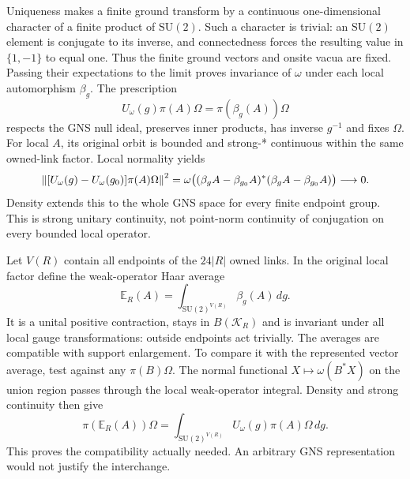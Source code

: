 Uniqueness makes a finite ground transform by a continuous one-dimensional character of a finite product of $\mathrm{SU}(2)$. Such a character is trivial: an $\mathrm{SU}(2)$ element is conjugate to its inverse, and connectedness forces the resulting value in $\{1,-1\}$ to equal one. Thus the finite ground vectors and onsite vacua are fixed. Passing their expectations to the limit proves invariance of $\omega$ under each local automorphism $\beta_g$. The prescription
\begin{equation}
 U_\omega(g)\pi(A)\Omega=\pi(\beta_g(A))\Omega
 \label{eq:aj1-gauge}
\end{equation}
respects the GNS null ideal, preserves inner products, has inverse $g^{-1}$ and fixes $\Omega$. For local $A$, its original orbit is bounded and strong-* continuous within the same owned-link factor. Local normality yields
\begin{equation}
 \left\lVert[U_\omega(g)-U_\omega(g_0)]\pi(A)\Omega\right\rVert^2
 =\omega\big((\beta_gA-\beta_{g_0}A)^*(\beta_gA-\beta_{g_0}A)\big)
 \longrightarrow0.
\end{equation}
Density extends this to the whole GNS space for every finite endpoint group. This is strong unitary continuity, not point-norm continuity of conjugation on every bounded local operator.

Let $V(R)$ contain all endpoints of the $24|R|$ owned links. In the original local factor define the weak-operator Haar average
\begin{equation}
 \mathbb E_R(A)=\int_{\mathrm{SU}(2)^{V(R)}}\beta_g(A)\,dg.
\end{equation}
It is a unital positive contraction, stays in $B(\mathcal K_R)$ and is invariant under all local gauge transformations: outside endpoints act trivially. The averages are compatible with support enlargement. To compare it with the represented vector average, test against any $\pi(B)\Omega$. The normal functional $X\mapsto\omega(B^*X)$ on the union region passes through the local weak-operator integral. Density and strong continuity then give
\begin{equation}
 \pi(\mathbb E_R(A))\Omega
 =\int_{\mathrm{SU}(2)^{V(R)}}U_\omega(g)\pi(A)\Omega\,dg.
 \label{eq:aj1-average}
\end{equation}
This proves the compatibility actually needed. An arbitrary GNS representation would not justify the interchange.

